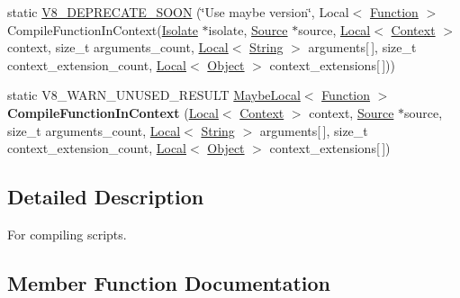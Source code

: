 \begin{DoxyCompactItemize}
\item 
static \hyperlink{classv8_1_1_script_compiler_ac2a02a50577714e996a23b8d3396af4d}{V8\+\_\+\+D\+E\+P\+R\+E\+C\+A\+T\+E\+\_\+\+S\+O\+O\+N} (\char`\"{}Use maybe version\char`\"{}, Local$<$ \hyperlink{classv8_1_1_function}{Function} $>$ Compile\+Function\+In\+Context(\hyperlink{classv8_1_1_isolate}{Isolate} $\ast$isolate, \hyperlink{classv8_1_1_script_compiler_1_1_source}{Source} $\ast$source, \hyperlink{classv8_1_1_local}{Local}$<$ \hyperlink{classv8_1_1_context}{Context} $>$ context, size\+\_\+t arguments\+\_\+count, \hyperlink{classv8_1_1_local}{Local}$<$ \hyperlink{classv8_1_1_string}{String} $>$ arguments\mbox{[}$\,$\mbox{]}, size\+\_\+t context\+\_\+extension\+\_\+count, \hyperlink{classv8_1_1_local}{Local}$<$ \hyperlink{classv8_1_1_object}{Object} $>$ context\+\_\+extensions\mbox{[}$\,$\mbox{]}))
\item 
\hypertarget{classv8_1_1_script_compiler_aa11d1768d4c9d5afda451a63360223a5}{}static V8\+\_\+\+W\+A\+R\+N\+\_\+\+U\+N\+U\+S\+E\+D\+\_\+\+R\+E\+S\+U\+L\+T \hyperlink{classv8_1_1_maybe_local}{Maybe\+Local}$<$ \hyperlink{classv8_1_1_function}{Function} $>$ {\bfseries Compile\+Function\+In\+Context} (\hyperlink{classv8_1_1_local}{Local}$<$ \hyperlink{classv8_1_1_context}{Context} $>$ context, \hyperlink{classv8_1_1_script_compiler_1_1_source}{Source} $\ast$source, size\+\_\+t arguments\+\_\+count, \hyperlink{classv8_1_1_local}{Local}$<$ \hyperlink{classv8_1_1_string}{String} $>$ arguments\mbox{[}$\,$\mbox{]}, size\+\_\+t context\+\_\+extension\+\_\+count, \hyperlink{classv8_1_1_local}{Local}$<$ \hyperlink{classv8_1_1_object}{Object} $>$ context\+\_\+extensions\mbox{[}$\,$\mbox{]})\label{classv8_1_1_script_compiler_aa11d1768d4c9d5afda451a63360223a5}

\end{DoxyCompactItemize}


\subsection{Detailed Description}
For compiling scripts. 

\subsection{Member Function Documentation}
\hypertarget{classv8_1_1_script_compiler_aea78877b0dccde1e587ee1ddeda1c155}{}
